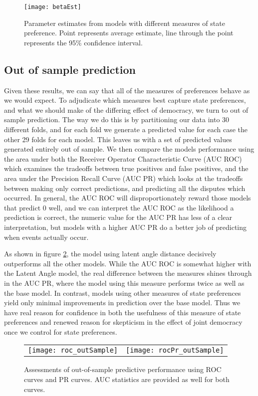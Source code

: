 \begin{figure}[ht]
	\centering
	\texttt{[image: betaEst]}
	\caption{Parameter estimates from models with different measures of state preference. Point represents average estimate, line through the point represents the 95\% confidence interval.}
	\label{fig:coefP}
\end{figure}
\FloatBarrier

\subsection{Out of sample prediction}

Given these results, we can say that all of the measures of preferences behave as we would expect. To adjudicate which measures best capture state preferences, and what we should make of the differing effect of democracy, we turn to out of sample prediction. The way we do this is by partitioning our data into 30 different folds, and for each fold we generate a predicted value for each case the other 29 folds for each model. This leaves us with a set of predicted values generated entirely out of sample. We then compare the models performance using the area under both the Receiver Operator Characteristic Curve (AUC ROC) which examines the tradeoffs between true positives and false positives, and the area under the Precision Recall Curve (AUC PR) which looks at the tradeoffs between making only correct predictions, and predicting all the disputes which occurred. In general, the AUC ROC will disproportionately reward those models that predict $0$ well, and we can interpret the AUC ROC as the likelihood a prediction is correct, the numeric value for the AUC PR has less of a clear interpretation, but models with a higher AUC PR do a better job of predicting when events actually occur.

As shown in figure \ref{fig:roc}, the model using latent angle distance decisively outperforms all the other models. While the AUC ROC is somewhat higher with the Latent Angle model, the real difference between the measures shines through in the AUC PR, where the model using this measure performs twice as well as the base model. In contrast, models using other measures of state preferences yield only minimal improvements in prediction over the base model. Thus we have real reason for confidence in both the usefulness of this measure of state preferences and renewed reason for skepticism in the effect of joint democracy once we control for state preferences. 

\begin{figure}[ht]
	\centering
	\begin{tabular}{cc}
	\texttt{[image: roc\_outSample]} & 
	\texttt{[image: rocPr\_outSample]}	
	\end{tabular}
	\caption{Assessments of out-of-sample predictive performance using ROC curves and PR curves. AUC statistics are provided as well for both curves.}
	\label{fig:roc}
\end{figure}
\FloatBarrier

